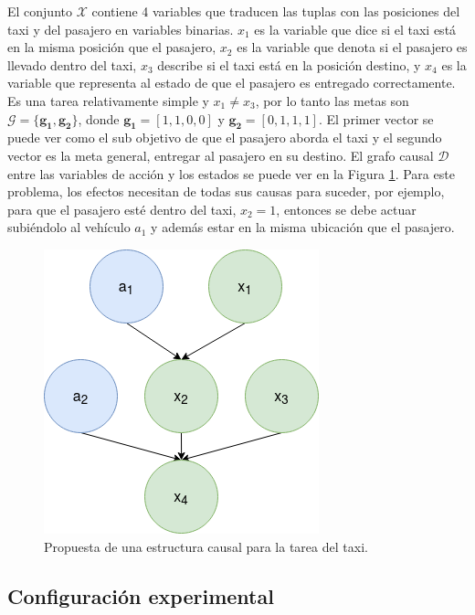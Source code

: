 El conjunto $\mathcal{X}$ contiene 4 variables que traducen las tuplas con las posiciones del taxi y del pasajero en variables binarias. $x_1$
es la variable que dice si el taxi está en la misma posición que el
pasajero, $x_2$ es la variable que denota si el pasajero es llevado dentro del taxi, $x_3$ describe si el taxi está en la posición destino,
y $x_4$ es la variable que representa al estado de que el pasajero es entregado correctamente. Es una tarea relativamente simple y $x_1 \neq x_3$, por lo tanto las metas son $\mathcal{G} = \{\mathbf{g_1}, \mathbf{g_2}\}$, donde $\mathbf{g_1} = [1, 1, 0 , 0]$ y $\mathbf{g_2} = [0,1,1,1]$. El primer vector se puede ver como el sub objetivo de que el pasajero aborda el taxi y el segundo vector es la meta general, 
entregar al pasajero en su destino.
El grafo causal $\mathcal{D}$ entre las variables de acción y los estados se puede 
ver en la Figura \ref{fig:cm-taxi}. Para este problema, los efectos
necesitan de todas sus causas para suceder, por ejemplo, para que el
pasajero esté dentro del taxi, $x_2 = 1$, entonces se debe actuar
subiéndolo al vehículo $a_1$ y además estar en la misma ubicación que
el pasajero.

\begin{figure}[H]
    \centering
    \includegraphics[scale=0.35]{Chapter5/Figs/causal_structure_taxi.png}
    \caption{Propuesta de una estructura causal para la tarea del taxi.}
    \label{fig:cm-taxi}
\end{figure}


\subsection{Configuración experimental}


